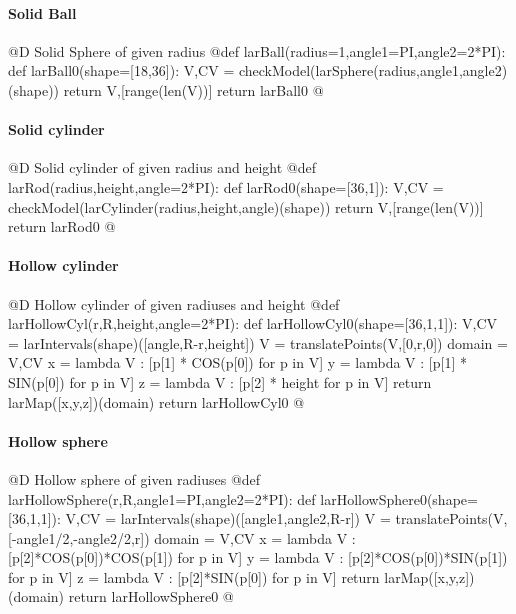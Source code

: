 \documentclass[11pt,oneside]{article}	%
\begin{document}
\paragraph{Solid Ball}
@D Solid Sphere of given radius
@{def larBall(radius=1,angle1=PI,angle2=2*PI):
	def larBall0(shape=[18,36]):
		V,CV = checkModel(larSphere(radius,angle1,angle2)(shape))
		return V,[range(len(V))]
	return larBall0
@}

\paragraph{Solid cylinder}
@D Solid cylinder of given radius and height
@{def larRod(radius,height,angle=2*PI):
	def larRod0(shape=[36,1]):
		V,CV = checkModel(larCylinder(radius,height,angle)(shape))
		return V,[range(len(V))]
	return larRod0
@}

\paragraph{Hollow cylinder}
@D Hollow cylinder of given radiuses and height
@{def larHollowCyl(r,R,height,angle=2*PI):
	def larHollowCyl0(shape=[36,1,1]):
		V,CV = larIntervals(shape)([angle,R-r,height])
		V = translatePoints(V,[0,r,0])
		domain = V,CV
		x = lambda V : [p[1] * COS(p[0]) for p in V]
		y = lambda V : [p[1] * SIN(p[0]) for p in V]
		z = lambda V : [p[2] * height for p in V]
		return larMap([x,y,z])(domain)
	return larHollowCyl0
@}

\paragraph{Hollow sphere}
@D Hollow sphere of given radiuses
@{def larHollowSphere(r,R,angle1=PI,angle2=2*PI):
	def larHollowSphere0(shape=[36,1,1]):
		V,CV = larIntervals(shape)([angle1,angle2,R-r])
		V = translatePoints(V,[-angle1/2,-angle2/2,r])
		domain = V,CV
		x = lambda V : [p[2]*COS(p[0])*COS(p[1]) for p in V]
		y = lambda V : [p[2]*COS(p[0])*SIN(p[1]) for p in V]
		z = lambda V : [p[2]*SIN(p[0]) for p in V]
		return larMap([x,y,z])(domain)
	return larHollowSphere0
@}
\end{document}
